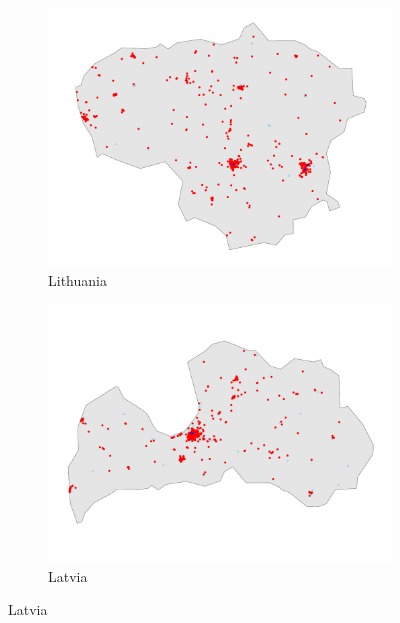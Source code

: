 \documentclass[12pt]{report}
\begin{document}
\begin{figure}[ht]
\begin{subfigure}[b]{0.45\textwidth}
        \includegraphics[width=\linewidth]{../Output/LT_map.pdf}
        \caption{Lithuania}
        \label{fig:map_obs_LT}
    \end{subfigure}
    \hfill
    \begin{subfigure}[b]{0.45\textwidth}
        \centering
        \includegraphics[width=\linewidth]{../Output/LV_map.pdf}
        \caption{Latvia}
        \label{fig:map_obs_LV}
    \end{subfigure}
\end{figure}
\end{document}
